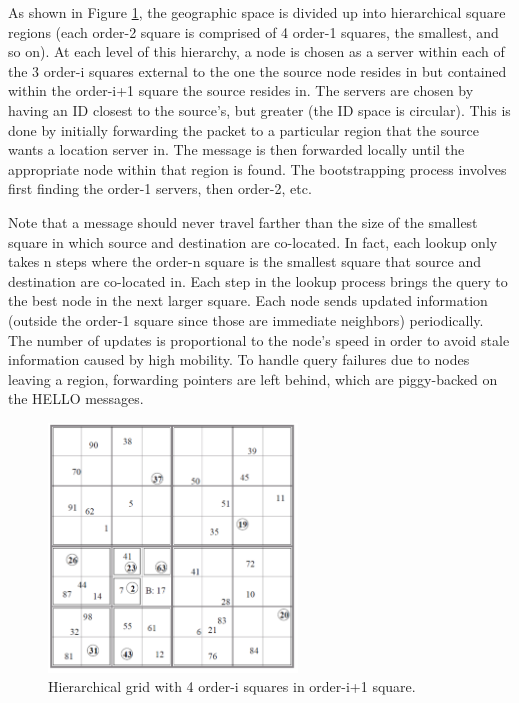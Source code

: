 \documentclass[conference]{IEEEtran}
\newcommand{\colwidth}{2.6in}
\begin{document}
As shown in Figure \ref{fig:location-service}, the geographic space is divided up into hierarchical square regions (each order-2 square is comprised of 4 order-1 squares, the smallest, and so on).
At each level of this hierarchy, a node is chosen as a server within each of the 3 order-i squares external to the one the source node resides in but contained within the order-i+1 square the source resides in. 
The servers are chosen by having an ID closest to the source's, but greater (the ID space is circular).
This is done by initially forwarding the packet to a particular region that the source wants a location server in.
The message is then forwarded locally until the appropriate node within that region is found.
The bootstrapping process involves first finding the order-1 servers, then order-2, etc.

Note that a message should never travel farther than the size of the smallest square in which source and destination are co-located.
In fact, each lookup only takes n steps where the order-n square is the smallest square that source and destination are co-located in.   
Each step in the lookup process brings the query to the best node in the next larger square.          
Each node sends updated information (outside the order-1 square since those are immediate neighbors) periodically.
The number of updates is proportional to the node's speed in order to avoid stale information caused by high mobility.
To handle query failures due to nodes leaving a region, forwarding pointers are left behind, which are piggy-backed on the HELLO messages.

\begin{figure}
\label{fig:location-service}
\centering
\includegraphics[width=\colwidth]{../../images/external/location_routing/location_service.pdf}
\caption{Hierarchical grid with 4 order-i squares in order-i+1 square.}
\end{figure}
\end{document}
